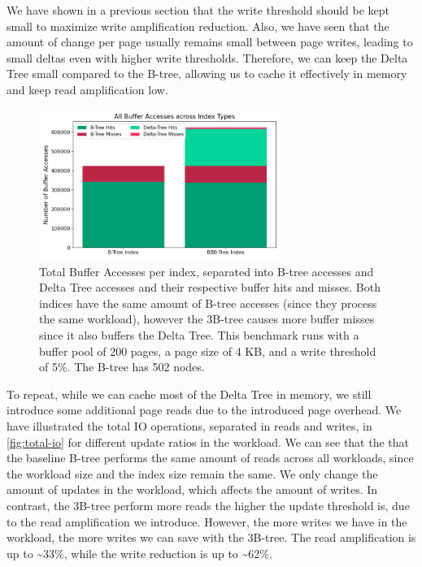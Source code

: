 We have shown in a previous section that the write threshold should be kept small to maximize write amplification reduction.
Also, we have seen that the amount of change per page usually remains small between page writes, leading to small deltas even with higher write thresholds.
Therefore, we can keep the Delta Tree small compared to the B-tree, allowing us to cache it effectively in memory and keep read amplification low.

\begin{figure}[htbp]
  \centering
  \includegraphics[width=0.7\textwidth]{figures/evaluation/pageviews_buffer_accesses_mixed.png}
  \caption{Total Buffer Accesses per index, separated into B-tree accesses and Delta Tree accesses and their respective buffer hits and misses. Both indices have the same amount of B-tree accesses (since they process the same workload), however the 3B-tree causes more buffer misses since it also buffers the Delta Tree. This benchmark runs with a buffer pool of 200 pages, a page size of 4 KB, and a write threshold of 5\%. The B-tree has 502 nodes.} 
  \label{fig:buffer-traffic}
\end{figure}

To repeat, while we can cache most of the Delta Tree in memory, we still introduce some additional page reads due to the introduced page overhead.
We have illustrated the total \ac{IO} operations, separated in reads and writes, in \autoref{fig:total-io} for different update ratios in the workload.
We can see that the that the baseline B-tree performs the same amount of reads across all workloads, since the workload size and the index size remain the same.
We only change the amount of updates in the workload, which affects the amount of writes.
In contrast, the 3B-tree perform more reads the higher the update threshold is, due to the read amplification we introduce.
However, the more writes we have in the workload, the more writes we can save with the 3B-tree.
The read amplification is up to \textasciitilde33\%, while the write reduction is up to \textasciitilde62\%.

